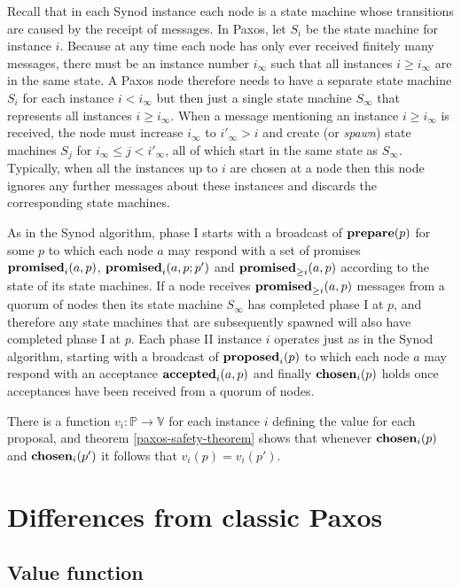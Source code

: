 \documentclass[journal]{IEEEtran}
\begin{document}
Recall that in each Synod instance each node is a state machine whose
transitions are caused by the receipt of messages. In Paxos, let $S_i$ be the
state machine for instance $i$. Because at any time each node has only ever
received finitely many messages, there must be an instance number $i_\infty$
such that all instances $i \ge i_\infty$ are in the same state. A Paxos node
therefore needs to have a separate state machine $S_i$ for each instance $i <
i_\infty$ but then just a single state machine $S_\infty$ that represents all
instances $i \ge i_\infty$. When a message mentioning an instance $i \ge
i_\infty$ is received, the node must increase $i_\infty$ to $i'_\infty > i$ and
create (or \textit{spawn}) state machines $S_j$ for $i_\infty \le j <
i'_\infty$, all of which start in the same state as $S_\infty$. Typically, when
all the instances up to $i$ are chosen at a node then this node ignores any
further messages about these instances and discards the corresponding state
machines.

As in the Synod algorithm, phase I starts with a broadcast of $\mathbf{prepare}(p)$ for
some $p$ to which each node $a$ may respond with a set of promises
$\mathbf{promised}_{i}(a,p)$, $\mathbf{promised}_{i}(a,p;p')$ and $\mathbf{promised}_{\ge i}(a,p)$ according to the
state of its state machines. If a node receives $\mathbf{promised}_{\ge i}(a,p)$ messages from
a quorum of nodes then its state machine $S_\infty$ has completed phase I at
$p$, and therefore any state machines that are subsequently spawned will also
have completed phase I at $p$. Each phase II instance $i$ operates just as in
the Synod algorithm, starting with a broadcast of $\mathbf{proposed}_{i}(p)$ to which each
node $a$ may respond with an acceptance $\mathbf{accepted}_{i}(a,p)$ and finally
$\mathbf{chosen}_{i}(p)$ holds once acceptances have been received from a quorum of
nodes.

There is a function $v_i : \mathbb P \to \mathbb V$ for each instance $i$
defining the value for each proposal, and theorem \ref{paxos-safety-theorem}
shows that whenever $\mathbf{chosen}_{i}(p)$ and $\mathbf{chosen}_{i}(p')$ it follows that
$v_i(p) = v_i(p')$.

\section{Differences from classic Paxos} \label{deviations-from-classic}

\subsection{Value function}
\end{document}

